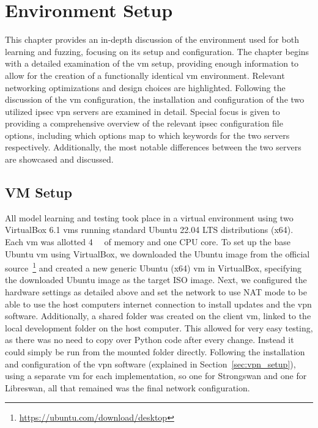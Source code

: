 %
%
% 
% 
% 

\chapter{Environment Setup} \label{chap:setup}

This chapter provides an in-depth discussion of the environment used for both learning and fuzzing, focusing on its setup and configuration. The chapter begins with a detailed examination of the \ac{vm} setup, providing enough information to allow for the creation of a functionally identical \ac{vm} environment. Relevant networking optimizations and design choices are highlighted. Following the discussion of the \ac{vm} configuration, the installation and configuration of the two utilized \ac{ipsec} \ac{vpn} servers are examined in detail. Special focus is given to providing a comprehensive overview of the relevant \ac{ipsec} configuration file options, including which options map to which keywords for the two servers respectively. Additionally, the most notable differences between the two servers are showcased and discussed.

\section{VM Setup} \label{sec:vm_setup}
All model learning and testing took place in a virtual environment using two VirtualBox 6.1 \acp{vm} running standard Ubuntu 22.04 LTS distributions (x64). Each \ac{vm} was allotted  \SI{4}{\giga\byte} of memory and one CPU core. To set up the base Ubuntu \ac{vm} using VirtualBox, we downloaded the Ubuntu image from the official source~\footnote{\url{https://ubuntu.com/download/desktop}} and created a new generic Ubuntu (x64) \ac{vm} in VirtualBox, specifying the downloaded Ubuntu image as the target ISO image. Next, we configured the hardware settings as detailed above and set the network to use NAT mode to be able to use the host computers internet connection to install updates and the \ac{vpn} software.
Additionally, a shared folder was created on the client \ac{vm}, linked to the local development folder on the host computer. This allowed for very easy testing, as there was no need to copy over Python code after every change. Instead it could simply be run from the mounted folder directly. Following the installation and configuration of the \ac{vpn} software (explained in Section~\ref{sec:vpn_setup}), using a separate \ac{vm} for each implementation, so one for Strongswan and one for Libreswan, all that remained was the final network configuration.

